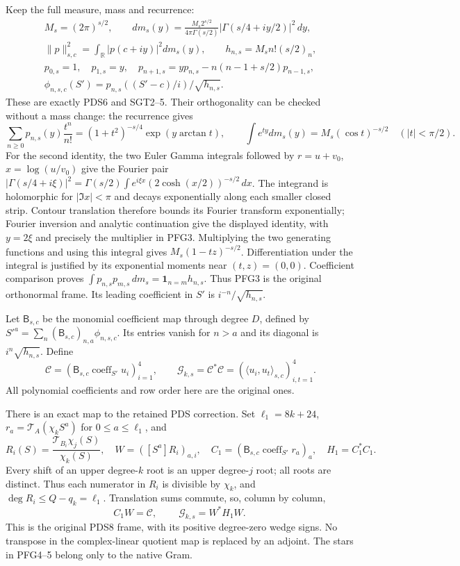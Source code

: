\documentclass[10pt]{article}
\begin{document}
Keep the full measure, mass and recurrence:
\[
\begin{gathered}
 M_s=(2\pi)^{s/2},\qquad
 dm_s(y)=\frac{M_s2^{s/2}}{4\pi\Gamma(s/2)}
                  |\Gamma(s/4+iy/2)|^2\,dy,\\
 \|p\|_{s,c}^2=\int_{\mathbb R}|p(c+iy)|^2dm_s(y),\qquad
 h_{n,s}=M_sn!(s/2)_n,\\
 p_{0,s}=1,\quad p_{1,s}=y,\quad
 p_{n+1,s}=yp_{n,s}-n(n-1+s/2)p_{n-1,s},\\
 \phi_{n,s,c}(S')=
       p_{n,s}((S'-c)/i)/\sqrt{h_{n,s}} .
\end{gathered}\tag{PFG3}
\]
These are exactly PDS6 and SGT2--5. Their orthogonality can be
checked without a mass change: the recurrence gives
\[
 \sum_{n\ge0}p_{n,s}(y)\frac{t^n}{n!}
 =(1+t^2)^{-s/4}\exp(y\arctan t),\qquad
 \int e^{ty}dm_s(y)=M_s(\cos t)^{-s/2}\quad(|t|<\pi/2).
\]
For the second identity, the two Euler Gamma integrals followed by
$r=u+v_0$, $x=\log(u/v_0)$ give the Fourier pair
$|\Gamma(s/4+i\xi)|^2
=\Gamma(s/2)\int e^{i\xi x}(2\cosh(x/2))^{-s/2}\,dx$.
The integrand is holomorphic for $|\Im x|<\pi$ and decays
exponentially along each smaller closed strip. Contour translation
therefore bounds its Fourier transform exponentially; Fourier
inversion and analytic continuation give the displayed identity,
with $y=2\xi$ and precisely the multiplier in PFG3.
Multiplying the two generating functions and using this integral
gives $M_s(1-tz)^{-s/2}$. Differentiation under the integral is
justified by its exponential moments near $(t,z)=(0,0)$.
Coefficient comparison proves
$\int p_{n,s}p_{m,s}\,dm_s=\mathbf1_{n=m}h_{n,s}$.
Thus PFG3 is the original orthonormal frame. Its leading coefficient
in $S'$ is $i^{-n}/\sqrt{h_{n,s}}$.

Let $\mathsf B_{s,c}$ be the monomial coefficient map through degree
$D$, defined by $S'^a=\sum_n(\mathsf B_{s,c})_{n,a}\phi_{n,s,c}$.
Its entries vanish for $n>a$ and its diagonal is
$i^n\sqrt{h_{n,s}}$. Define
\[
 \mathcal C=(\mathsf B_{s,c}\operatorname{coeff}_{S'}u_i)_{i=1}^4,
 \qquad
 \mathcal G_{k,s}=\mathcal C^*\mathcal C
       =(\langle u_i,u_t\rangle_{s,c})_{i,t=1}^4 .
 \tag{PFG4}
\]
All polynomial coefficients and row order here are the original ones.

There is an exact map to the retained PDS correction. Set
$\ell_1=8k+24$, $r_a=\mathcal T_A(\chi_kS^a)$ for
$0\le a\le\ell_1$, and
\[
 R_i(S)=\frac{\mathcal T_{B_i}\chi_j(S)}{\chi_k(S)},\quad
 W=([S^a]R_i)_{a,i},\quad
 C_1=(\mathsf B_{s,c}\operatorname{coeff}_{S'}r_a)_a,\quad
 H_1=C_1^*C_1 .
\]
Every shift of an upper degree-$k$ root is an upper degree-$j$
root; all roots are distinct. Thus each numerator in $R_i$ is
divisible by $\chi_k$, and $\deg R_i\le Q-q_k=\ell_1$.
Translation sums commute, so, column by column,
\[
 C_1W=\mathcal C,\qquad
 \boxed{\ \mathcal G_{k,s}=W^*H_1W.\ }\tag{PFG5}
\]
This is the original PDS8 frame, with its positive degree-zero wedge
signs. No transpose in the complex-linear quotient map is replaced
by an adjoint. The stars in PFG4--5 belong only to the native Gram.
\end{document}
